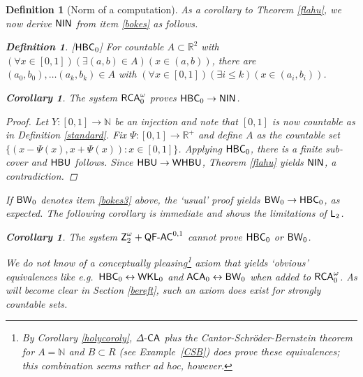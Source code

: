 \documentclass[reqno]{amsart}
\newtheorem{cor}[thm]{Corollary}
\newtheorem{defi}[thm]{Definition}
\def\bdefi{\begin{defi}\rm}
\def\edefi{\end{defi}}
\def\Z{\textup{\textsf{Z}}}
\def\RCAo{\textup{\textsf{RCA}}_{0}^{\omega}}
\def\WKL{\textup{\textsf{WKL}}}
\def\N{{\mathbb  N}}
\def\R{{\mathbb  R}}
\def\L{\textsf{\textup{L}}}
\def\di{\rightarrow}
\def\asa{\leftrightarrow}
\def\ACA{\textup{\textsf{ACA}}}
\def\QFAC{\textup{\textsf{QF-AC}}}
\def\HBU{\textup{\textsf{HBU}}}
\def\BW{\textup{\textsf{BW}}}
\def\DCA{\Delta\textup{\textsf{-CA}}}
\def\NIN{\textup{\textsf{NIN}}}
\def\WHBU{\textup{\textsf{WHBU}}}
\def\HBC{\textup{\textsf{HBC}}}
\numberwithin{equation}{section}
\numberwithin{thm}{section}
\begin{document}
\begin{defi}[Norm of a computation]
As a corollary to Theorem \ref{flahu}, we now derive $\NIN$ from item \eqref{bokes} as follows.  
\bdefi[$\HBC_{0}$]
For countable $A\subset \R^{2}$ with $(\forall x\in [0,1])(\exists (a, b)\in A)(x\in (a, b))$, there are $(a_{0}, b_{0}), \dots (a_{k}, b_{k})\in A$ with $(\forall x\in [0,1])(\exists i\leq k)(x\in (a_{i},b_{i} ))$.
\edefi
\begin{cor}\label{forgot}
The system $\RCAo$ proves $\HBC_{0}\di \NIN$.
\end{cor}
\begin{proof}
Let $Y:[0, 1]\di \N$ be an injection and note that $[0,1]$ is now countable as in Definition \ref{standard}.
Fix $\Psi:[0,1]\di \R^{+}$ and define $A$ as the countable set $\{ (x-\Psi(x), x+\Psi(x)):x\in [0,1] \}$.   
Applying $\HBC_{0}$, there is a finite sub-cover and $\HBU$ follows.  Since $\HBU\di \WHBU$, Theorem \ref{flahu} yields $\NIN$, a contradiction. 
\end{proof}
If $\BW_{0}$ denotes item \eqref{bokes3} above, the `usual' proof yields $\BW_{0}\di \HBC_{0}$, as expected. 
The following corollary is immediate and shows the limitations of $\L_{2}$.
\begin{cor}
The system $\Z_{2}^{\omega}+\QFAC^{0,1}$ cannot prove $\HBC_{0}$ or $\BW_{0}$.
\end{cor}
We do not know of a conceptually pleasing\footnote{By Corollary \ref{holycoroly}, $\DCA$ \emph{plus} the Cantor-Schr\"oder-Bernstein theorem for $A=\N$ and $B\subset R$ (see Example~\ref{CSB}) does prove these equivalences; this combination seems rather ad hoc, however.} axiom that yields `obvious' equivalences like e.g.\ $\HBC_{0}\asa \WKL_{0}$ and $\ACA_{0}\asa \BW_{0}$ when added to $\RCAo$. 
As will become clear in Section \ref{bereft}, such an axiom does exist for strongly countable sets. 

\smallskip


\end{defi}
\end{document}
